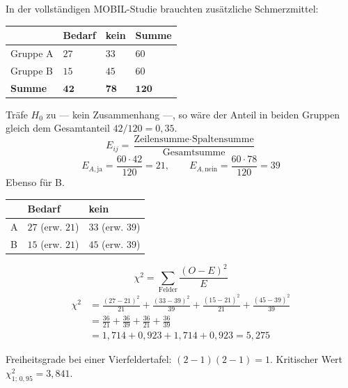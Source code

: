 \begin{merksatz}
In der vollständigen MOBIL-Studie brauchten zusätzliche Schmerzmittel:

\begin{center}
\renewcommand{\arraystretch}{1.5}
\begin{tabular}{@{}P{2.0cm}P{1.8cm}P{1.8cm}P{1.6cm}@{}}
\toprule
& \textbf{Bedarf} & \textbf{kein} & \textbf{Summe}\\
\midrule
Gruppe A & $27$ & $33$ & $60$\\
Gruppe B & $15$ & $45$ & $60$\\
\midrule
\textbf{Summe} & $\mathbf{42}$ & $\mathbf{78}$ & $\mathbf{120}$\\
\bottomrule
\end{tabular}
\end{center}

Träfe $H_0$ zu --- kein Zusammenhang ---, so wäre der Anteil in beiden Gruppen gleich dem Gesamtanteil $42/120 = 0{,}35$.
\[ E_{ij} = \frac{\text{Zeilensumme} \cdot \text{Spaltensumme}}{\text{Gesamtsumme}} \]
\[ E_{A,\text{ja}} = \frac{60 \cdot 42}{120} = 21, \qquad E_{A,\text{nein}} = \frac{60 \cdot 78}{120} = 39 \]
Ebenso für B.

\begin{center}
\renewcommand{\arraystretch}{1.45}
\begin{tabular}{@{}P{2.0cm}P{2.4cm}P{2.4cm}@{}}
\toprule
& \textbf{Bedarf} & \textbf{kein}\\
\midrule
A & $27$ (erw. $21$) & $33$ (erw. $39$)\\
B & $15$ (erw. $21$) & $45$ (erw. $39$)\\
\bottomrule
\end{tabular}
\end{center}

\[ \chi^2 = \sum_{\text{Felder}} \frac{(O - E)^2}{E} \]
\begin{align*}
\chi^2 &= \frac{(27-21)^2}{21} + \frac{(33-39)^2}{39} + \frac{(15-21)^2}{21} + \frac{(45-39)^2}{39}\\
&= \frac{36}{21} + \frac{36}{39} + \frac{36}{21} + \frac{36}{39}\\
&= 1{,}714 + 0{,}923 + 1{,}714 + 0{,}923 = 5{,}275
\end{align*}

Freiheitsgrade bei einer Vierfeldertafel: $(2-1)(2-1) = 1$. Kritischer Wert $\chi^2_{1;\,0{,}95} = 3{,}841$.


\end{merksatz}
